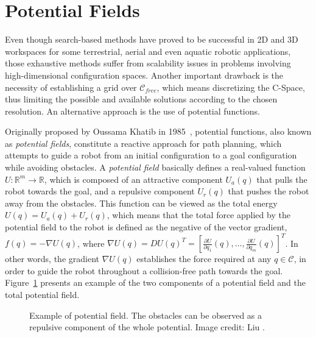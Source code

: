 \section{Potential Fields}
\label{sec:PotenFields}

Even though search-based methods have proved to be successful in \ac{2D} and
\ac{3D} workspaces for some terrestrial, aerial and even aquatic robotic
applications, those exhaustive methods suffer from scalability issues in
problems involving high-dimensional configuration spaces. Another important
drawback is the necessity of establishing a grid over $\mathcal{C}_{free}$,
which means discretizing the \ac{C-Space}, thus limiting the possible and
available solutions according to the chosen resolution. An alternative approach
is the use of potential functions.

Originally proposed by Oussama Khatib in 1985~\cite{Khatib1985,Khatib1986},
potential functions, also known as \textit{potential fields}, constitute a
reactive approach for path planning, which attempts to guide a robot from an
initial configuration to a goal configuration while avoiding obstacles. A
\textit{potential field} basically defines a real-valued function $U:
\mathbb{R}^m \rightarrow \mathbb{R}$, which is composed of an attractive
component $U_a(q)$ that pulls the robot towards the goal, and a repulsive
component $U_r(q)$ that pushes the robot away from the obstacles. This function
can be viewed as the total energy $U(q) = U_a(q) + U_r(q)$, which means that the
total force applied by the potential field to the robot is defined as the
negative of the vector gradient, \ie $f(q) = -\nabla U(q)$, where $\nabla U(q) =
DU(q)^T = \left[ \frac{\partial U}{\partial q_1}(q), \ldots, \frac{\partial
U}{\partial q_m}(q) \right]^T$. In other words, the gradient $\nabla U(q)$
establishes the force required at any $q \in \mathcal{C}$, in order to guide the
robot throughout a collision-free path towards the goal.
Figure~\ref{fig:potential-field} presents an example of the two components of a
potential field and the total potential field.


\begin{figure}[htbp]
    \myfloatalign
     \quad
\caption[Example of potential field.]
{Example of potential field. The obstacles can be observed as a repulsive
component of the whole potential. Image credit: Liu \etal\cite{Liu2016}.}
\label{fig:potential-field}
\end{figure}

